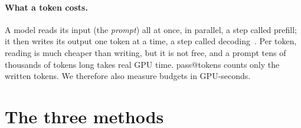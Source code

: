 \documentclass[11pt]{article}
\begin{document}
\paragraph{What a token costs.} A model reads its input (the \emph{prompt}) all at once, in parallel, a step called
prefill; it then writes its output one token at a time, a step called decoding~\citep{pope2023inference}. Per token,
reading is much cheaper than writing, but it is not free, and a prompt tens of thousands of tokens long takes real
GPU time. pass@tokens counts only the written tokens. We therefore also measure budgets in GPU-seconds.

\section{The three methods}
\label{sec:methods}
\end{document}
